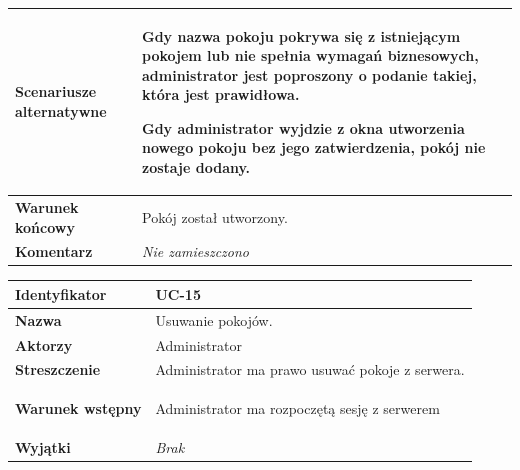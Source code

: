 {\begin{tabular}{ | l | l | }
	\hline
		\textbf{Scenariusze alternatywne} & \parbox[t]
		{11cm}{
			\begin{enumreq}
				\item Gdy nazwa pokoju pokrywa się z istniejącym pokojem lub nie spełnia
				wymagań biznesowych, administrator jest poproszony o podanie takiej,
				która jest prawidłowa.
				\item Gdy administrator wyjdzie z okna utworzenia nowego pokoju bez
				jego zatwierdzenia, pokój nie zostaje dodany.
			\end{enumreq}
		}
		\\

	\hline
		\textbf{Warunek końcowy} & \parbox[t]{11cm}{
			Pokój został utworzony.
		}
		\\

	\hline
		\textbf{Komentarz} & \parbox[t]{11cm}{
			\textit{Nie zamieszczono}
		}
		\\

	\hline
\end{tabular}

\vspace{2em}

\begin{tabular}{ | l | l | }
	\hline
		\textbf{Identyfikator} &
		UC-15
		\\

	\hline
		\textbf{Nazwa} &
		Usuwanie pokojów.
		\\

	\hline
		\textbf{Aktorzy} & \parbox[t]{11cm}{
			Administrator
		}\\

	\hline
		\textbf{Streszczenie} & \parbox[t]{11cm}{
			Administrator ma prawo usuwać pokoje z serwera.

		}\\

	\hline
		\textbf{Warunek wstępny} & \parbox[t]{11cm}{
			\begin{enumreq}
				\item Administrator ma rozpoczętą sesję z serwerem
			\end{enumreq}

		}
		\\

	\hline
		\textbf{Wyjątki} & \parbox[t]{11cm}{
			\textit{Brak}

		}
		\\


\end{tabular}}

